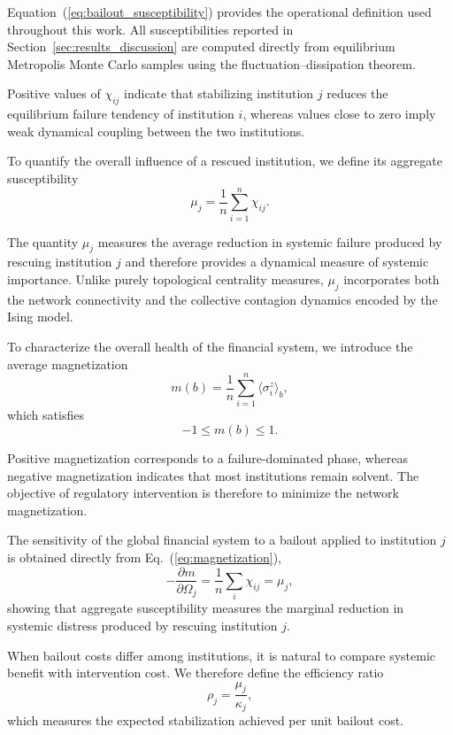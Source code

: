 \documentclass[aps,reprint,superscriptaddress,pra]{revtex4-2}
\begin{document}
Equation~(\ref{eq:bailout_susceptibility}) provides the operational definition used throughout this work. All susceptibilities reported in Section~\ref{sec:results_discussion} are computed directly from equilibrium Metropolis Monte Carlo samples using the fluctuation--dissipation theorem.

Positive values of $\chi_{ij}$ indicate that stabilizing institution $j$ reduces the equilibrium failure tendency of institution $i$, whereas values close to zero imply weak dynamical coupling between the two institutions.

To quantify the overall influence of a rescued institution, we define its aggregate susceptibility
\begin{equation}
\mu_j
=
\frac1n
\sum_{i=1}^{n}
\chi_{ij}.
\label{eq:aggregate_susceptibility}
\end{equation}

The quantity $\mu_j$ measures the average reduction in systemic failure produced by rescuing institution $j$ and therefore provides a dynamical measure of systemic importance. Unlike purely topological centrality measures, $\mu_j$ incorporates both the network connectivity and the collective contagion dynamics encoded by the Ising model.

To characterize the overall health of the financial system, we introduce the average magnetization
\begin{equation}
m(b)
=
\frac1n
\sum_{i=1}^{n}
\langle\sigma_i^z\rangle_b,
\label{eq:magnetization}
\end{equation}
which satisfies
\[
-1\le m(b)\le1.
\]

Positive magnetization corresponds to a failure-dominated phase, whereas negative magnetization indicates that most institutions remain solvent. The objective of regulatory intervention is therefore to minimize the network magnetization.

The sensitivity of the global financial system to a bailout applied to institution $j$ is obtained directly from Eq.~(\ref{eq:magnetization}),
\begin{equation}
-
\frac{\partial m}{\partial\Omega_j}
=
\frac1n
\sum_i\chi_{ij}
=
\mu_j,
\end{equation}
showing that aggregate susceptibility measures the marginal reduction in systemic distress produced by rescuing institution $j$.

When bailout costs differ among institutions, it is natural to compare systemic benefit with intervention cost. We therefore define the efficiency ratio
\begin{equation}
\rho_j
=
\frac{\mu_j}{\kappa_j},
\label{eq:efficiency_ratio}
\end{equation}
which measures the expected stabilization achieved per unit bailout cost.
\end{document}
